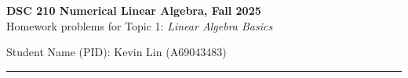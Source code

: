\documentclass[11pt,letterpaper]{article}
\begin{document}
\pagestyle{plain}


 
\begin{center}
\textbf{\Large DSC 210 Numerical Linear Algebra, Fall 2025} \\ \bigskip
\large{Homework problems for Topic 1: \textit{Linear Algebra Basics}} \\  \bigskip
\begin{flushleft}
    \large{Student Name (PID): Kevin Lin (A69043483)}
\end{flushleft}
\end{center}
\vspace{-4mm}
\rule{\linewidth}{0.1mm}

\bigskip
\end{document}
